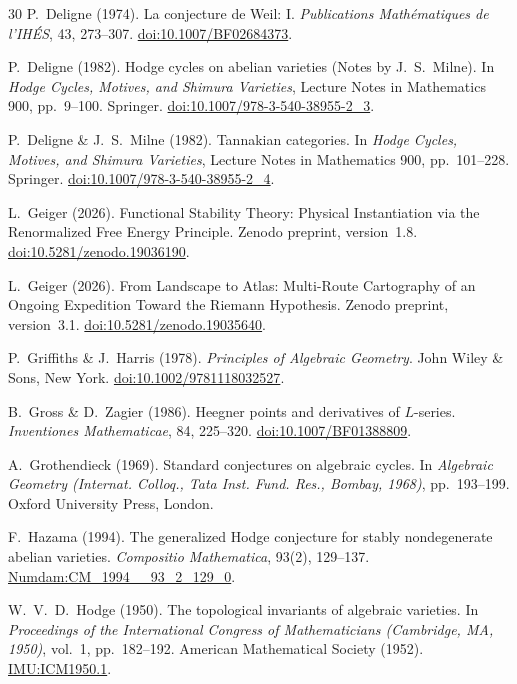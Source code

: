 \documentclass[aps,prd,twocolumn,superscriptaddress,nofootinbib]{revtex4-2}
\theoremstyle{definition}
\theoremstyle{remark}
\begin{document}
\begin{thebibliography}{30}
P.~Deligne (1974).
La conjecture de Weil: I.
\textit{Publications Math\'ematiques de l'IH\'ES}, 43, 273--307.
\href{https://doi.org/10.1007/BF02684373}{doi:10.1007/BF02684373}.

P.~Deligne (1982).
Hodge cycles on abelian varieties (Notes by J.~S.~Milne).
In \textit{Hodge Cycles, Motives, and Shimura Varieties}, Lecture Notes in Mathematics 900, pp.\ 9--100. Springer.
\href{https://doi.org/10.1007/978-3-540-38955-2_3}{doi:10.1007/978-3-540-38955-2\_3}.

P.~Deligne \& J.~S.~Milne (1982).
Tannakian categories.
In \textit{Hodge Cycles, Motives, and Shimura Varieties}, Lecture Notes in Mathematics 900, pp.\ 101--228. Springer.
\href{https://doi.org/10.1007/978-3-540-38955-2_4}{doi:10.1007/978-3-540-38955-2\_4}.

L.~Geiger (2026).
Functional Stability Theory: Physical Instantiation via the Renormalized Free Energy Principle.
Zenodo preprint, version~1.8.
\href{https://doi.org/10.5281/zenodo.19036190}{doi:10.5281/zenodo.19036190}.

L.~Geiger (2026).
From Landscape to Atlas: Multi-Route Cartography of an Ongoing Expedition Toward the Riemann Hypothesis.
Zenodo preprint, version~3.1.
\href{https://doi.org/10.5281/zenodo.19035640}{doi:10.5281/zenodo.19035640}.

P.~Griffiths \& J.~Harris (1978).
\textit{Principles of Algebraic Geometry}.
John Wiley \& Sons, New York.
\href{https://doi.org/10.1002/9781118032527}{doi:10.1002/9781118032527}.

B.~Gross \& D.~Zagier (1986).
Heegner points and derivatives of $L$-series.
\textit{Inventiones Mathematicae}, 84, 225--320.
\href{https://doi.org/10.1007/BF01388809}{doi:10.1007/BF01388809}.

A.~Grothendieck (1969).
Standard conjectures on algebraic cycles.
In \textit{Algebraic Geometry (Internat. Colloq., Tata Inst. Fund. Res., Bombay, 1968)}, pp.\ 193--199. Oxford University Press, London.

F.~Hazama (1994).
The generalized Hodge conjecture for stably nondegenerate abelian varieties.
\textit{Compositio Mathematica}, 93(2), 129--137.
\href{http://www.numdam.org/item/CM_1994__93_2_129_0/}{Numdam:CM\_1994\_\_93\_2\_129\_0}.

W.~V.~D.~Hodge (1950).
The topological invariants of algebraic varieties.
In \textit{Proceedings of the International Congress of Mathematicians (Cambridge, MA, 1950)}, vol.~1, pp.\ 182--192. American Mathematical Society (1952).
\href{https://www.mathunion.org/fileadmin/IMU/ICM/ICM1950.1/ICM1950.1.ocr.pdf}{IMU:ICM1950.1}.


\end{thebibliography}
\end{document}
